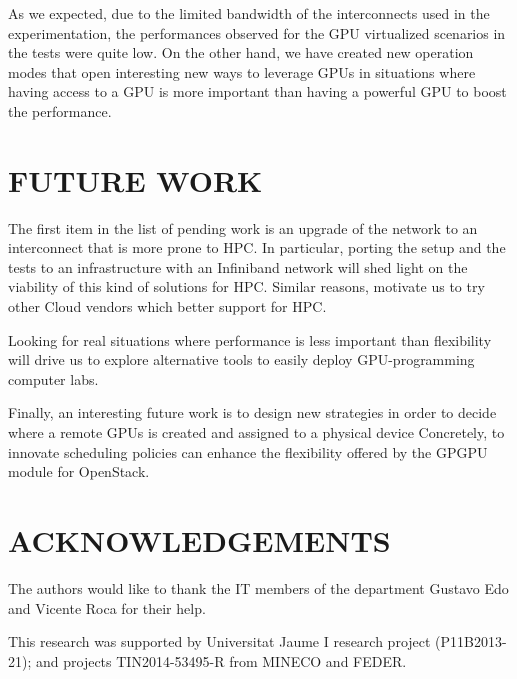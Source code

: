 \documentclass[a4paper,twoside]{article}
\begin{document}
As we expected, due to the limited bandwidth of the interconnects used in the experimentation, the performances observed for the GPU virtualized scenarios in the tests were quite low.
On the other hand, we have created new operation modes that open interesting new ways to leverage GPUs in situations where having access to a GPU is more important than having a powerful GPU to boost the performance.

\section{\uppercase{Future work}}
\label{sec:future}
The first item in the list of pending work is an upgrade of the network to an interconnect that is more prone to HPC.
In particular, porting the setup and the tests to an infrastructure with an Infiniband network will shed light on the viability of this kind of solutions for HPC.
Similar reasons, motivate us to try other Cloud vendors which better support for HPC.

Looking for real situations where performance is less important than flexibility will drive us to explore alternative tools to easily deploy GPU-programming computer labs.

Finally, an interesting future work is to design new strategies in order to decide where a remote GPUs is created and assigned to a physical device
Concretely, to innovate scheduling policies can enhance the flexibility offered by the GPGPU module for OpenStack.

\section*{\uppercase{Acknowledgements}}
The authors would like to thank the IT members of the department Gustavo Edo and Vicente Roca for their help.

This research was supported by Universitat Jaume I research project (P11B2013-21); and projects
TIN2014-53495-R from MINECO and FEDER.


{\small
}
\end{document}
